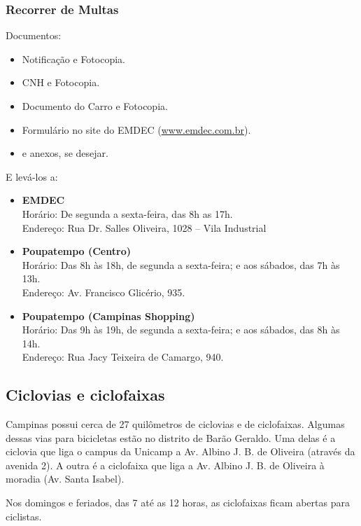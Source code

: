 \subsubsection{Recorrer de Multas}

Documentos:
\begin{itemize}
    \item Notificação e Fotocopia.
    \item CNH e Fotocopia.
    \item Documento do Carro e Fotocopia.
    \item Formulário no site do EMDEC (\url{www.emdec.com.br}).
    \item e anexos, se desejar.
\end{itemize}

E levá-los a:
\begin{itemize}
    \item \textbf{EMDEC}
        \\Horário: De segunda a sexta-feira, das 8h as 17h.
        \\Endereço: Rua Dr. Salles Oliveira, 1028 -- Vila Industrial

    \item \textbf{Poupatempo (Centro)}
        \\Horário: Das 8h às 18h, de segunda a sexta-feira;
                    e aos sábados, das 7h às 13h.
        \\Endereço: Av. Francisco Glicério, 935.

    \item \textbf{Poupatempo (Campinas Shopping)}
        \\Horário: Das 9h às 19h, de segunda a sexta-feira;
                    e aos sábados, das 8h às 14h.
        \\Endereço: Rua Jacy Teixeira de Camargo, 940.
\end{itemize}

\subsection{Ciclovias e ciclofaixas}

Campinas possui cerca de 27 quilômetros de ciclovias e de ciclofaixas. Algumas
dessas vias para bicicletas estão no distrito de Barão Geraldo. Uma delas é a
ciclovia que liga o campus da Unicamp a Av. Albino J. B. de Oliveira (através
da avenida 2). A outra é a ciclofaixa que liga a Av. Albino J. B. de Oliveira
à moradia (Av. Santa Isabel).

Nos domingos e feriados, das 7 até as 12 horas, as ciclofaixas ficam abertas
para ciclistas.

